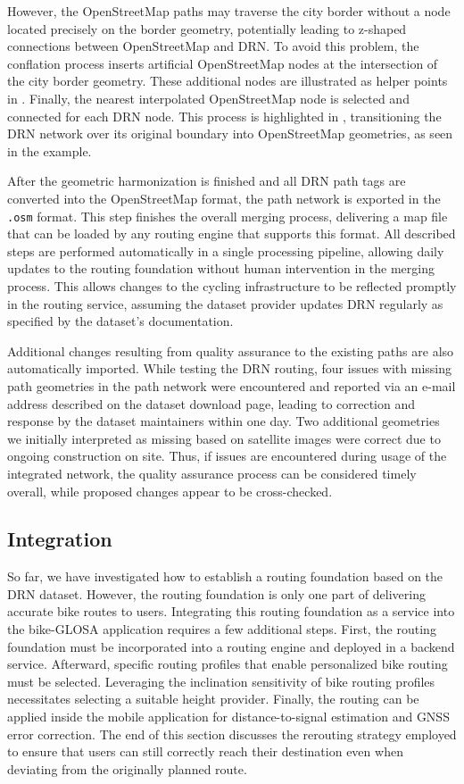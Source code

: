 However, the OpenStreetMap paths may traverse the city border without a node located precisely on the border geometry, potentially leading to z-shaped connections between OpenStreetMap and DRN. To avoid this problem, the conflation process inserts artificial OpenStreetMap nodes at the intersection of the city border geometry. These additional nodes are illustrated as helper points in . Finally, the nearest interpolated OpenStreetMap node is selected and connected for each DRN node. This process is highlighted in , transitioning the DRN network over its original boundary into OpenStreetMap geometries, as seen in the example.

After the geometric harmonization is finished and all DRN path tags are converted into the OpenStreetMap format, the path network is exported in the \texttt{.osm} format. This step finishes the overall merging process, delivering a map file that can be loaded by any routing engine that supports this format. All described steps are performed automatically in a single processing pipeline, allowing daily updates to the routing foundation without human intervention in the merging process. This allows changes to the cycling infrastructure to be reflected promptly in the routing service, assuming the dataset provider updates DRN regularly as specified by the dataset's documentation. 

Additional changes resulting from quality assurance to the existing paths are also automatically imported. While testing the DRN routing, four issues with missing path geometries in the path network were encountered and reported via an e-mail address described on the dataset download page, leading to correction and response by the dataset maintainers within one day. Two additional geometries we initially interpreted as missing based on satellite images were correct due to ongoing construction on site. Thus, if issues are encountered during usage of the integrated network, the quality assurance process can be considered timely overall, while proposed changes appear to be cross-checked.

\subsection{Integration}

So far, we have investigated how to establish a routing foundation based on the DRN dataset. However, the routing foundation is only one part of delivering accurate bike routes to users. Integrating this routing foundation as a service into the bike-GLOSA application requires a few additional steps. First, the routing foundation must be incorporated into a routing engine and deployed in a backend service. Afterward, specific routing profiles that enable personalized bike routing must be selected. Leveraging the inclination sensitivity of bike routing profiles necessitates selecting a suitable height provider. Finally, the routing can be applied inside the mobile application for distance-to-signal estimation and GNSS error correction. The end of this section discusses the rerouting strategy employed to ensure that users can still correctly reach their destination even when deviating from the originally planned route.

